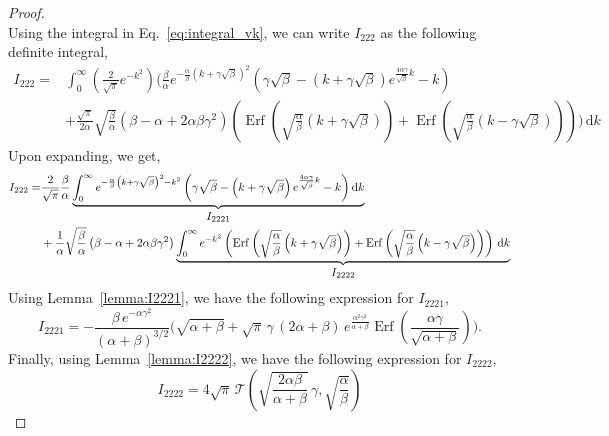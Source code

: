 \documentclass[journal]{IEEEtran}
\theoremstyle{plain}
\theoremstyle{definition}
\theoremstyle{remark}
\newcommand{\Ot}{\mathcal{T}}
\newcommand{\Erf}{\operatorname{Erf}}
\newcommand{\dd}{\mathrm{d}}
\begin{document}
\begin{proof}
\begin{equation}
\end{equation}
Using the integral in Eq.~\eqref{eq:integral_vk}, we can write $I_{222}$ as the following definite integral,
\begin{equation}
\begin{split}
    I_{222} =& \int_{0}^\infty \left(\frac{2}{\sqrt{\pi}} e^{-k^2}\right) \biggl(\frac{\beta}{\alpha} e^{-\frac{\alpha}{\beta}  \left(k + \gamma\sqrt{\beta } \right)^2} \left( \gamma\sqrt{\beta } -\left(k + \gamma\sqrt{\beta } \right) e^{\frac{4 \alpha  \gamma }{\sqrt{\beta }} k} - k\right) \\&+ \frac{\sqrt{\pi}}{2\alpha} \sqrt{\frac{\beta }{\alpha }} \left(\beta - \alpha  + 2 \alpha\beta \gamma ^2 \right) \left(\Erf\left(\sqrt{\frac{\alpha}{\beta}}\left(k+\gamma\sqrt{\beta}\right)\right)+\Erf\left(\sqrt{\frac{\alpha}{\beta}}\left(k-\gamma\sqrt{\beta}\right) \right)\right)\biggr) \,\dd k 
\end{split} 
\end{equation}
Upon expanding, we get,
\begin{equation}
\begin{split}
    I_{222} =& \frac{2}{\sqrt{\pi}}  \frac{\beta}{\alpha}  \underbrace{\int_{0}^\infty e^{-\frac{\alpha}{\beta}  \left(k + \gamma\sqrt{\beta } \right)^2 - k^2} \left( \gamma\sqrt{\beta } -\left(k + \gamma\sqrt{\beta } \right) e^{\frac{4 \alpha  \gamma }{\sqrt{\beta }} k} - k\right)  \dd k}_{\text{\normalsize \(I_{2221}\)}} \\
    &+ \frac{1}{\alpha} \sqrt{\frac{\beta }{\alpha }} \left(\beta - \alpha  + 2 \alpha\beta \gamma ^2 \right) \underbrace{ \int_{0}^\infty e^{-k^2}\left(\Erf\left(\sqrt{\frac{\alpha}{\beta}}\left(k+\gamma\sqrt{\beta}\right)\right)+\Erf\left(\sqrt{\frac{\alpha}{\beta}}\left(k-\gamma\sqrt{\beta}\right) \right)\right) \,\dd k }_{\text{\normalsize \(I_{2222}\)}}
\end{split} \label{eq:I222_defn}
\end{equation}
Using Lemma~\ref{lemma:I2221}, we have the following expression for $I_{2221}$,
\begin{equation}
    I_{2221} = -\frac{\beta \, e^{-\alpha  \gamma ^2} }{(\alpha +\beta )^{3/2}} \biggl(\sqrt{\alpha +\beta } +\sqrt{\pi } \,\gamma \, (2 \alpha +\beta ) \, e^{\frac{\alpha ^2 \gamma ^2}{\alpha +\beta }} \Erf\left(\frac{\alpha  \gamma }{\sqrt{\alpha +\beta }}\right)\biggr).
\end{equation}
Finally, using Lemma~\ref{lemma:I2222}, we have the following expression for $I_{2222}$,
\begin{equation}
    I_{2222} = 4 \sqrt{\pi} \,\Ot\left(\sqrt{\frac{2 \alpha \beta}{\alpha + \beta}} \, \gamma, \sqrt{\frac{\alpha}{\beta}}\right)
\end{equation}


\end{proof}
\end{document}
